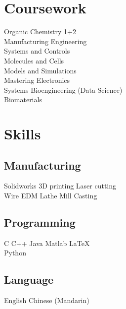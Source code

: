 \documentclass[]{deedy-resume}
\begin{document}
\begin{minipage}[t]{0.3\textwidth}



\section{Coursework}
Organic Chemistry 1+2\\
Manufacturing Engineering\\
Systems and Controls\\
Molecules and Cells\\
Models and Simulations\\
Mastering Electronics\\
Systems Bioengineering (Data Science)\\
Biomaterials\\



\section{Skills}
\subsection{Manufacturing}
Solidworks \textbullet{}   3D printing \textbullet{} Laser cutting \\
Wire EDM \textbullet{} Lathe \textbullet{} Mill \textbullet{} Casting \\
\sectionsep
\subsection{Programming}
C \textbullet{} C++ \textbullet{} Java \textbullet{} Matlab \textbullet \LaTeX \\
Python
\sectionsep
\subsection{Language}
English \textbullet{} Chinese (Mandarin)
\sectionsep

\end{minipage}
\end{document}
